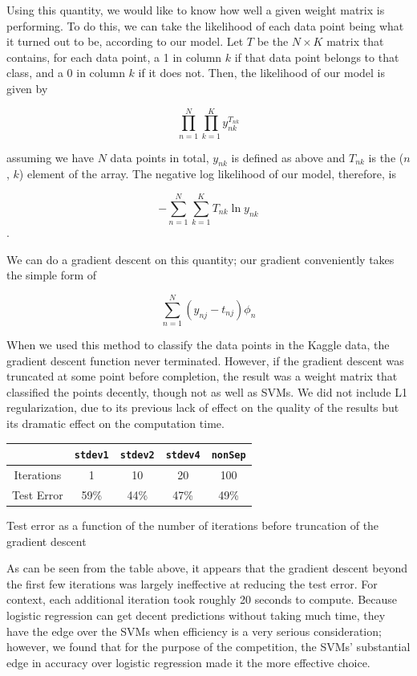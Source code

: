\documentclass{sigchi}
\begin{document}
Using this quantity, we would like to know how well a given weight matrix is performing. To do this, we can take the likelihood of each data point being what it turned out to be, according to our model. Let $T$ be the $N \times K$ matrix that contains, for each data point, a 1 in column $k$ if that data point belongs to that class, and a 0 in column $k$ if it does not. Then, the likelihood of our model is given by 

$$\prod_{n=1}^N \prod_{k=1}^K y_{nk}^{T_{nk}}$$

assuming we have $N$ data points in total, $y_{nk}$ is defined as above and $T_{nk}$ is the ($n$, $k$) element of the array. The negative log likelihood of our model, therefore, is 

$$-\sum_{n=1}^N \sum_{k=1}^K T_{nk} \ln y_{nk}$$.

We can do a gradient descent on this quantity; our gradient conveniently takes the simple form of 

$$\sum_{n=1}^N (y_{nj}-t_{nj})\phi_n$$

When we used this method to classify the data points in the Kaggle data, the gradient descent function never terminated. However, if the gradient descent was truncated at some point before completion, the result was a weight matrix that classified the points decently, though not as well as SVMs. We did not include L1 regularization, due to its previous lack of effect on the quality of the results but its dramatic effect on the computation time. \\

	\begin{tabular}{| c | c | c | c | c |}
	\hline
	& \texttt{stdev1} & \texttt{stdev2} & \texttt{stdev4} & \texttt{nonSep}\\
	\hline
	Iterations & 1 & 10 & 20 & 100 \\
	\hline
	Test Error & 59\% & 44\% & 47\% & 49\% \\
	\hline
	\end{tabular}
	\caption{Test error as a function of the number of iterations before truncation of the gradient descent}

As can be seen from the table above, it appears that the gradient descent beyond the first few iterations was largely ineffective at reducing the test error. For context, each additional iteration took roughly 20 seconds to compute. Because logistic regression can get decent predictions without taking much time, they have the edge over the SVMs when efficiency is a very serious consideration; however, we found that for the purpose of the competition, the SVMs' substantial edge in accuracy over logistic regression made it the more effective choice.
\end{document}
